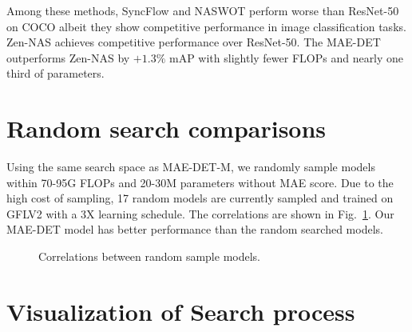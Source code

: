 \documentclass[nohyperref]{article}
\theoremstyle{plain}
\theoremstyle{definition}
\theoremstyle{remark}
\begin{document}
Among these methods, SyncFlow and NASWOT perform worse than ResNet-50 on COCO albeit they show competitive performance in image classification tasks. Zen-NAS achieves competitive performance over ResNet-50. The MAE-DET outperforms Zen-NAS by $+1.3\%$ mAP with slightly fewer FLOPs and nearly one third of parameters.


\section{Random search comparisons}\label{app:random}

Using the same search space as MAE-DET-M, we randomly sample models within 70-95G FLOPs and 20-30M parameters without MAE score. Due to the high cost of sampling, 17 random models are currently sampled and trained on GFLV2 with a 3X learning schedule. The correlations are shown in Fig.~\ref{fig:sample}. Our MAE-DET model has better performance than the random searched models.

\begin{figure}[h]
	\centering
\caption{Correlations between random sample models.}
	\label{fig:sample}	
\end{figure}
\vspace{-8pt}


\section{Visualization of Search process}\label{app:vsp}
\end{document}
